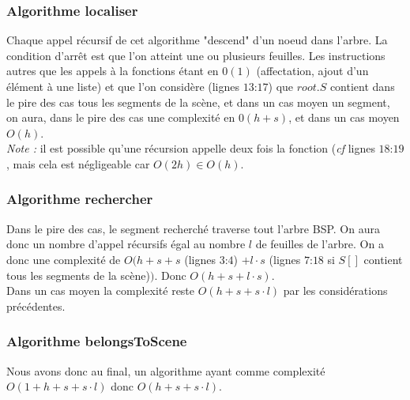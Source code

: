 \documentclass[10pt]{article}
\begin{document}
\subsubsection{Algorithme localiser}
Chaque appel récursif de cet algorithme "descend" d'un noeud dans l'arbre. La condition d'arrêt est que l'on atteint une ou plusieurs feuilles. Les instructions autres que les appels à la fonctions étant en $0(1)$ (affectation, ajout d'un élément à une liste) et que l'on considère (lignes $13$:$17$) que $root.S$ contient dans le pire des cas tous les segments de la scène, et dans un cas moyen un segment, on aura, dans le pire des cas une complexité en $0(h+s)$, et dans un cas moyen $O(h)$.\\[.5cm]
\emph{Note : }il est possible qu'une récursion appelle deux fois la fonction (\emph{cf} lignes $18$:$19$, mais cela est négligeable car $O(2h)\in O(h)$.
\subsubsection{Algorithme rechercher}
Dans le pire des cas, le segment recherché traverse tout l'arbre BSP. On aura donc un nombre d'appel récursifs égal au nombre $l$ de feuilles de l'arbre. On a donc une complexité de $O(h+s+s$ (lignes $3$:$4$) $+ l\cdot s$ (lignes $7$:$18$ si $S[]$ contient tous les segments de la scène)$)$. Donc $O(h+s+l\cdot s)$.\\[.5cm]
Dans un cas moyen la complexité reste $O(h+s+s\cdot l)$ par les considérations précédentes.
\subsubsection{Algorithme belongsToScene}
Nous avons donc au final, un algorithme ayant comme complexité $O(1+h+s+s\cdot l)$ donc $O(h+s+s\cdot l)$.
\end{document}
